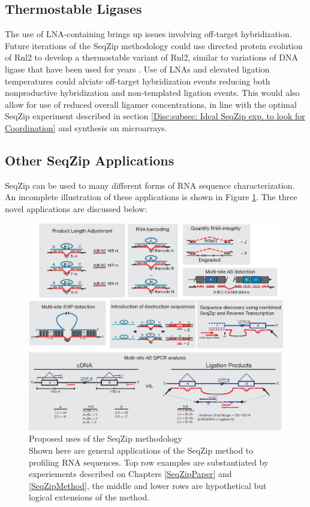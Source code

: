  \subsection{Thermostable Ligases}
    \label{Disc:subsec:Thermostable Ligases}

    The use of LNA-containing brings up issues involving off-target hybridization. Future iterations of the SeqZip methodology could use directed protein evolution of Rnl2 \citep{Stemmer1994, Romero2009a} to develop a thermostable variant of Rnl2, similar to variations of DNA ligase that have been used for years \citep{Barany1991}. Use of LNAs and elevated ligation temperatures could alviate off-target hybridization events reducing both nonproductive hybridization and non-templated ligation events. This would also allow for use of reduced overall ligamer concentrations, in line with the optimal SeqZip experiment described in section \ref{Disc:subsec: Ideal SeqZip exp. to look for Coordination} and synthesis on microarrays.

  \subsection{Other SeqZip Applications}
    \label{Disc:subsec:Future Uses of SeqZip}

    SeqZip can be used to many different forms of RNA sequence characterization. An incomplete illustration of these applications is shown in Figure \ref{Disc:fig: Panel of SeqZip Applications}. The three novel applications are discussed below:

    \begin{figure} %
      \centering 
      \includegraphics{Figures/Discussion/SeqZipUses.eps}
      \caption[Proposed uses of the SeqZip methodology]
      {Proposed uses of the SeqZip methodology \\[0.25cm]
        Shown here are general applications of the SeqZip method to profiling RNA sequences. Top row examples are substantiated by experiements described on Chapters \ref{SeqZipPaper} and \ref{SeqZipMethod}, the middle and lower rows are hypothetical but logical extensions of the method.
        }
      \label{Disc:fig: Panel of SeqZip Applications}
      \end{figure}

